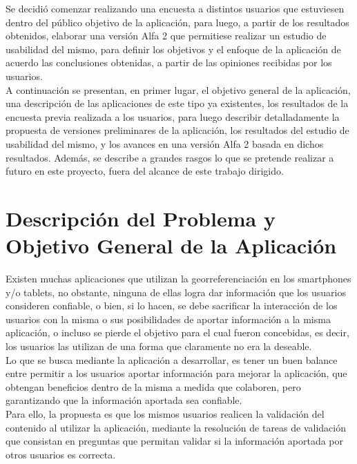 \documentclass[10pt,letterpaper]{article}
\begin{document}
Se decidió comenzar realizando una encuesta a distintos usuarios que estuviesen dentro del público objetivo de la aplicación, para luego, a partir de los resultados obtenidos, elaborar una versión Alfa 2 que permitiese realizar un estudio de usabilidad del mismo, para definir los objetivos y el enfoque de la aplicación de acuerdo las conclusiones obtenidas, a partir de las opiniones recibidas por los usuarios.\\

A continuación se presentan, en primer lugar, el objetivo general de la aplicación, una descripción de las aplicaciones de este tipo ya existentes, los resultados de la encuesta previa realizada a los usuarios, para luego describir detalladamente la propuesta de versiones preliminares de la aplicación, los resultados del estudio de usabilidad del mismo, y los avances en una versión Alfa 2 basada en dichos resultados. Además, se describe a grandes rasgos lo que se pretende realizar a futuro en este proyecto, fuera del alcance de este trabajo dirigido.\\

\newpage
\section{Descripción del Problema y Objetivo General de la Aplicación}

Existen muchas aplicaciones que utilizan la georreferenciación en los smartphones y/o tablets, no obstante, ninguna de ellas logra dar información que los usuarios consideren confiable, o bien, si lo hacen, se debe sacrificar la interacción de los usuarios con la misma o sus posibilidades de aportar información a la misma aplicación, o incluso se pierde el objetivo para el cual fueron concebidas, es decir, los usuarios las utilizan de una forma que claramente no era la deseable.\\

Lo que se busca mediante la aplicación a desarrollar, es tener un buen balance entre permitir a los usuarios aportar información para mejorar la aplicación, que obtengan beneficios dentro de la misma a medida que colaboren, pero garantizando que la información aportada sea confiable.\\

Para ello, la propuesta es que los mismos usuarios realicen la validación del contenido al utilizar la aplicación, mediante la resolución de tareas de validación que consistan en preguntas que permitan validar si la información aportada por otros usuarios es correcta.\\
\end{document}
